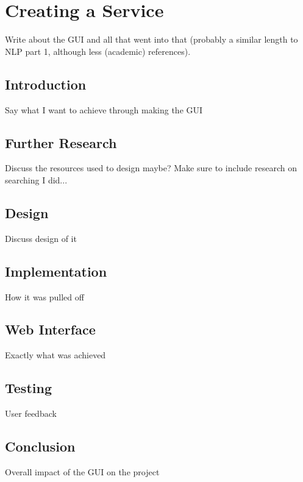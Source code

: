 \section{Creating a Service}
Write about the GUI and all that went into that (probably a similar length to NLP part 1, although less (academic) references).
\subsection{Introduction}
Say what I want to achieve through making the GUI
\subsection{Further Research}
Discuss the resources used to design maybe?
Make sure to include research on searching I did...
\subsection{Design}
Discuss design of it
\subsection{Implementation}
How it was pulled off
\subsection{Web Interface}
Exactly what was achieved
\subsection{Testing}
User feedback
\subsection{Conclusion}
Overall impact of the GUI on the project
